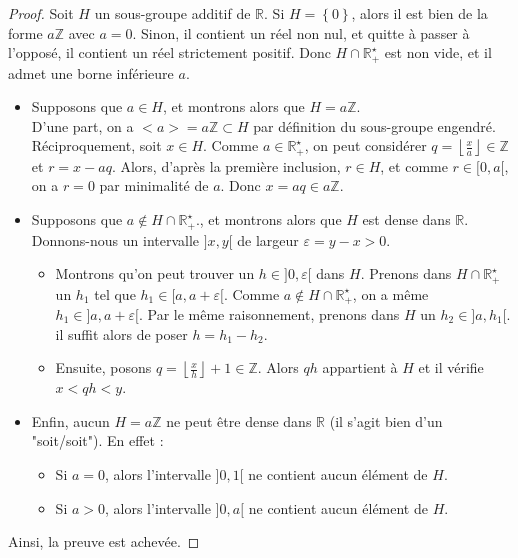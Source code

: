 \documentclass[french]{book}
\newcommand{\Z}{\mathbb{Z}}
\newcommand{\R}{\mathbb{R}}
\newcommand{\st}{^\star}
\theoremstyle{plain}
\theoremstyle{definition}
\theoremstyle{remark}
\begin{document}
\begin{proof}
	Soit $H$ un sous-groupe additif de $\R$. Si $H=\left\{0\right\}$, alors il est bien de la forme $a\Z$ avec $a=0$. Sinon, il contient un réel non nul, et quitte à passer à l'opposé, il contient un réel strictement positif. Donc $H\cap\R_+\st$ est non vide, et il admet une borne inférieure $a$.
	\begin{itemize}
		\item Supposons que $a\in H$, et montrons alors que $H=a\Z$. \\ D'une part, on a $<a>=a\Z\subset H$ par définition du sous-groupe engendré. Réciproquement, soit $x\in H$. Comme $a\in\R_+\st$, on peut considérer $q=\displaystyle\left\lfloor\frac{x}{a}\right\rfloor\in\Z$ et $r=x-aq$. Alors, d'après la première inclusion, $r\in H$, et comme $r\in[0,a[$, on a $r=0$ par minimalité de $a$. Donc $x=aq\in a\Z$.
		\item Supposons que $a\notin H\cap\R_+\st$., et montrons alors que $H$ est dense dans $\R$. \\ Donnons-nous un intervalle $]x,y[$ de largeur $\varepsilon=y-x>0$.
		\begin{itemize}
			\item Montrons qu'on peut trouver un $h\in]0,\varepsilon[$ dans $H$. Prenons dans $H\cap\R_+\st$ un $h_1$ tel que $h_1\in[a,a+\varepsilon[$. Comme $a\notin H\cap\R_+\st$, on a même $h_1\in]a,a+\varepsilon[$. Par le même raisonnement, prenons dans $H$ un $h_2\in]a,h_1[$. il suffit alors de poser $h=h_1-h_2$.
			\item Ensuite, posons $q=\displaystyle\left\lfloor\frac{x}{h}\right\rfloor+1\in\Z$. Alors $qh$ appartient à $H$ et il vérifie $x<qh<y$.
		\end{itemize}
		\item Enfin, aucun $H=a\Z$ ne peut être dense dans $\R$ (il s'agit bien d'un "soit/soit"). En effet :
		\begin{itemize}
			\item Si $a=0$, alors l'intervalle $]0,1[$ ne contient aucun élément de $H$.
			\item Si $a>0$, alors l'intervalle $]0,a[$ ne contient aucun élément de $H$.
		\end{itemize}
	\end{itemize}
	Ainsi, la preuve est achevée.
\end{proof}
\end{document}
